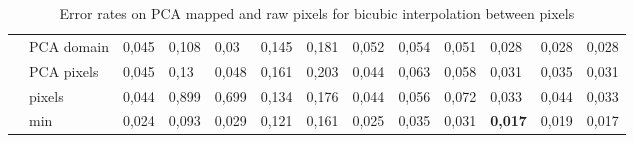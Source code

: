 \documentclass{article}
\begin{document}
\begin{table}[H]
\begin{tabular}{l|l|llllllllll|l|}
          & PCA domain & 0,045 & 0,108 & 0,03  & 0,145 & 0,181 & 0,052 & 0,054 & 0,051 & 0,028 & 0,028 & 0,028 \\
          & PCA pixels & 0,045 & 0,13  & 0,048 & 0,161 & 0,203 & 0,044 & 0,063 & 0,058 & 0,031 & 0,035 & 0,031 \\
          & pixels & 0,044 & 0,899 & 0,699 & 0,134 & 0,176 & 0,044 & 0,056 & 0,072 & 0,033 & 0,044 & 0,033 \\ \hline
          & min & 0,024 & 0,093 & 0,029 & 0,121 & 0,161 & 0,025 & 0,035 & 0,031 & \textbf{0,017} & 0,019 & 0,017 \\
    \hline
    \end{tabular}%
		\caption{Error rates on PCA mapped and raw pixels for bicubic interpolation between pixels}  \label{table: errorrates of PCA mappings bicubic}%
\end{table}%
\end{document}
